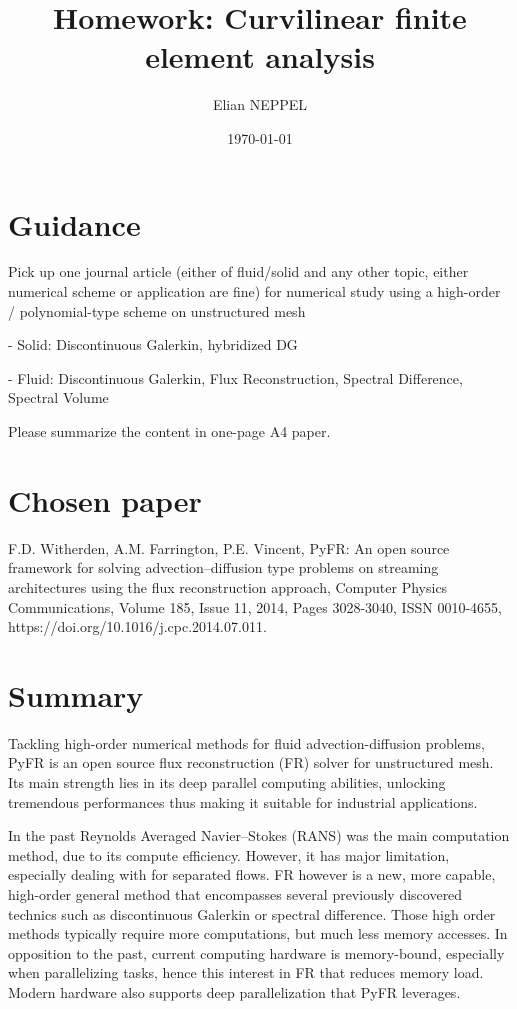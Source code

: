 \documentclass[12pt]{article}
\title{Homework: Curvilinear finite element analysis}
\author{Elian NEPPEL}
\date{\today}
\begin{document}
\maketitle

\section*{Guidance}

Pick up one journal article (either of fluid/solid and any other topic, either numerical scheme or application are fine) for numerical study using a high-order / polynomial-type scheme on unstructured mesh

- Solid: Discontinuous Galerkin, hybridized DG

- Fluid: Discontinuous Galerkin, Flux Reconstruction, Spectral Difference, Spectral Volume

Please summarize the content in one-page A4 paper.

\section*{Chosen paper}

F.D. Witherden, A.M. Farrington, P.E. Vincent,
PyFR: An open source framework for solving advection–diffusion type problems on streaming architectures using the flux reconstruction approach,
Computer Physics Communications,
Volume 185, Issue 11,
2014,
Pages 3028-3040,
ISSN 0010-4655,
https://doi.org/10.1016/j.cpc.2014.07.011.

\newpage
\section{Summary}

Tackling high-order numerical methods for fluid advection-diffusion problems, PyFR is an open source flux reconstruction (FR) solver for unstructured mesh.
Its main strength lies in its deep parallel computing abilities, unlocking tremendous performances thus making it suitable for industrial applications.

In the past Reynolds Averaged Navier–Stokes (RANS) was the main computation method, due to its compute efficiency. However, it has major limitation, especially dealing with for separated flows.
FR however is a new, more capable, high-order general method that encompasses several previously discovered technics such as discontinuous Galerkin or spectral difference. Those high order methods typically require more computations, but much less memory accesses. In opposition to the past, current computing hardware is memory-bound, especially when parallelizing tasks, hence this interest in FR that reduces memory load. Modern hardware also supports deep parallelization that PyFR leverages.
\end{document}
